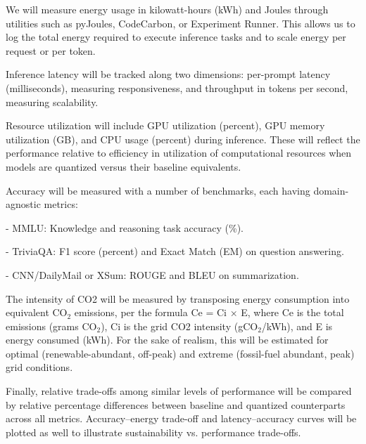 We will measure energy usage in kilowatt-hours (kWh) and Joules through utilities such as pyJoules, CodeCarbon, or Experiment Runner. This allows us to log the total energy required to execute inference tasks and to scale energy per request or per token.

Inference latency will be tracked along two dimensions: per-prompt latency (milliseconds), measuring responsiveness, and throughput in tokens per second, measuring scalability.

Resource utilization will include GPU utilization (percent), GPU memory utilization (GB), and CPU usage (percent) during inference. These will reflect the performance relative to efficiency in utilization of computational resources when models are quantized versus their baseline equivalents.

Accuracy will be measured with a number of benchmarks, each having domain-agnostic metrics:

- MMLU: Knowledge and reasoning task accuracy (\%).

- TriviaQA: F1 score (percent) and Exact Match (EM) on question answering.

- CNN/DailyMail or XSum: ROUGE and BLEU on summarization.

The intensity of CO2 will be measured by transposing energy consumption into equivalent CO$_2$ emissions, per the formula Ce = Ci × E, where Ce is the total emissions (grams CO$_2$), Ci is the grid CO2 intensity (gCO$_2$/kWh), and E is energy consumed (kWh). For the sake of realism, this will be estimated for optimal (renewable-abundant, off-peak) and extreme (fossil-fuel abundant, peak) grid conditions.

Finally, relative trade-offs among similar levels of performance will be compared by relative percentage differences between baseline and quantized counterparts across all metrics. Accuracy–energy trade-off and latency–accuracy curves will be plotted as well to illustrate sustainability vs. performance trade-offs.





